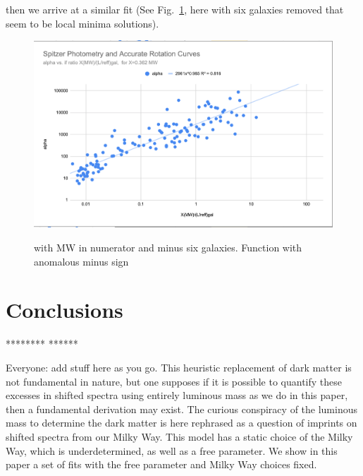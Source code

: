 \documentclass[reprint,%
 amsmath,amssymb,
 aps,
]{revtex4-1}
\begin{document}
then we arrive at a similar fit (See Fig.~\ref{alpha1}, here with six galaxies removed that seem to be local minima solutions).



\begin{figure}[h]
\scalebox{0.5}%
{\includegraphics{alphaSept2021} }
\caption{ with MW in  numerator and minus six galaxies. Function with anomalous minus sign }
\label{alpha1}
\end{figure} 

 
  

 
  
 \section{  Conclusions   }
********
******

 
{   \color{teal} Everyone: add stuff here as you go.  }
{\color{red} This heuristic replacement of dark matter is not fundamental in nature, but    one supposes if it is possible to quantify these
excesses in shifted spectra using entirely luminous mass as we do in this paper,  then a   fundamental derivation may exist.  The curious conspiracy of the luminous mass to   determine the dark matter  is here rephrased as a question of imprints on shifted spectra from our Milky Way.  This model has a static choice of the Milky Way, which is underdetermined, as well as a free parameter. We show in this paper a set of fits with the free parameter and Milky Way choices fixed. 
 }
 
\end{document}
